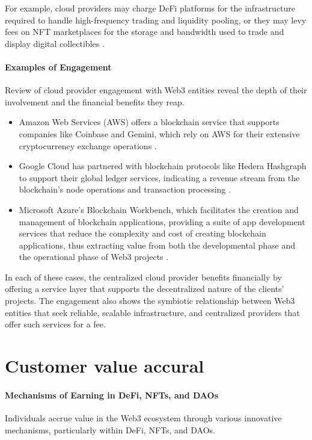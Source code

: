 \documentclass{article}
\begin{document}
For example, cloud providers may charge DeFi platforms for the infrastructure required to handle high-frequency trading and liquidity pooling, or they may levy fees on NFT marketplaces for the storage and bandwidth used to trade and display digital collectibles \cite{binanceresearch2021defi}.

\paragraph{Examples of Engagement} Review of cloud provider engagement with Web3 entities reveal the depth of their involvement and the financial benefits they reap. 

\begin{itemize}
    \item Amazon Web Services (AWS) offers a blockchain service that supports companies like Coinbase and Gemini, which rely on AWS for their extensive cryptocurrency exchange operations \cite{aws2021managedblockchain}. 
    \item Google Cloud has partnered with blockchain protocols like Hedera Hashgraph to support their global ledger services, indicating a revenue stream from the blockchain's node operations and transaction processing \cite{googlecloud2020hedera}.
    \item Microsoft Azure's Blockchain Workbench, which facilitates the creation and management of blockchain applications, providing a suite of app development services that reduce the complexity and cost of creating blockchain applications, thus extracting value from both the developmental phase and the operational phase of Web3 projects \cite{microsoft2018azure}.
\end{itemize}

In each of these cases, the centralized cloud provider benefits financially by offering a service layer that supports the decentralized nature of the clients' projects. The engagement also shows the symbiotic relationship between Web3 entities that seek reliable, scalable infrastructure, and centralized providers that offer such services for a fee.

\section{Customer value accural}

\paragraph{Mechanisms of Earning in DeFi, NFTs, and DAOs} Individuals accrue value in the Web3 ecosystem through various innovative mechanisms, particularly within DeFi, NFTs, and DAOs. 
\end{document}
